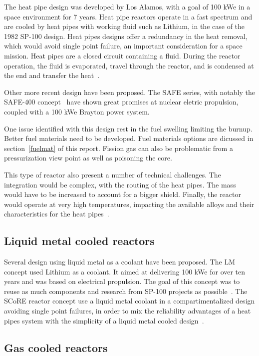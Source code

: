 \documentclass{article}
\begin{document}
The heat pipe design was developed by Los Alamos, with a goal of 100 kWe in a space environment for 7 years. Heat pipe reactors operate in a fast spectrum and are cooled by heat pipes with working fluid such as Lithium, in the case of the 1982 SP-100 design. Heat pipes designs offer a redundancy in the heat removal, which would avoid single point failure, an important consideration for a space mission. Heat pipes are a closed circuit containing a fluid. During the reactor operation, the fluid is evaporated, travel through the reactor, and is condensed at the end and transfer the heat~\cite{reid1999heat,dean1985heat}.

Other more recent design have been proposed. The SAFE series, with notably the SAFE-400 concept~\cite{poston2002design} have shown great promises at nuclear eletric propulsion, coupled with a 100 kWe Brayton power system.

One issue identified with this design rest in the fuel swelling limiting the burnup. Better fuel materials need to be developed. Fuel materials options are dicussed in section~\ref{fuelmat} of this report. Fission gas can also be problematic from a pressurization view point as well as poisoning the core.

This type of reactor also present a number of technical challenges. The integration would be complex, with the routing of the heat pipes. The mass would have to be increased to account for a bigger shield. Finally, the reactor would operate at very high temperatures, impacting the available alloys and their characteristics for the heat pipes~\cite{el2005score}. 

\subsection{Liquid metal cooled reactors}

Several design using liquid metal as a coolant have been proposed. The LM concept used Lithium as a coolant. It aimed at delivering 100 kWe for over ten years and was based on electrical propulsion. The goal of this concept was to reuse as much components and research from SP-100 projects as possible~\cite{weitzberg2003liquid}. The SCoRE reactor concept use a liquid metal coolant in a compartimentalized design avoiding single point failures, in order to mix the reliability advantages of a heat pipes system with the simplicity of a liquid metal cooled design~\cite{el2005score}.

\subsection{Gas cooled reactors}
\end{document}
